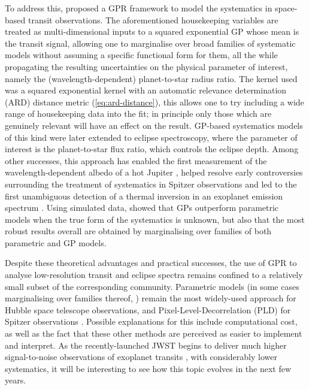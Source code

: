 \documentclass[letterpaper]{ar-1col}
\begin{document}
To address this, \citet{2012MNRAS.419.2683G} proposed a GPR framework to model the systematics in space-based transit observations. The aforementioned housekeeping variables are treated as multi-dimensional inputs to a squared exponential GP whose mean is the transit signal, allowing one to marginalise over broad families of systematic models without assuming a specific functional form for them, all the while propagating the resulting uncertainties on the physical parameter of interest, namely the (wavelength-dependent) planet-to-star radius ratio. The kernel used was a squared exponential kernel with an automatic relevance determination (ARD) distance metric (\autoref{eq:ard-distance}), this allows one to try including a wide range of housekeeping data into the fit; in principle only those which are genuinely relevant will have an effect on the result.
GP-based systematics models of this kind were later extended to eclipse spectroscopy, where the parameter of interest is the planet-to-star flux ratio, which controls the eclipse depth. Among other successes, this approach has enabled the first measurement of the wavelength-dependent albedo of a hot Jupiter \citep{2013ApJ...772L..16E}, helped resolve early controversies surrounding the treatment of systematics in Spitzer observations \citep{2015MNRAS.451..680E} and
led to the first unambiguous detection of a thermal inversion in an exoplanet emission spectrum \citep{2017Natur.548...58E}. Using simulated data, \citet{2014MNRAS.445.3401G} showed that GPs outperform parametric models when the true form of the systematics is unknown, but also that the most robust results overall are obtained by marginalising over families of both parametric and GP models.

Despite these theoretical advantages and practical successes, the use of GPR to analyse low-resolution transit and eclipse spectra remains confined to a relatively small subset of the corresponding community. Parametric models (in some cases marginalising over families thereof, \citealt{2016ApJ...819...10W}) remain the most widely-used approach for Hubble space telescope observations, and Pixel-Level-Decorrelation (PLD) for Spitzer observations \citep{2015ApJ...805..132D}. Possible explanations for this include computational cost, as well as the fact that these other methods are perceived as easier to implement and interpret. As the recently-launched JWST begins to deliver much higher signal-to-noise observations of exoplanet transits \citep[see e.g.][]{https://doi.org/10.48550/arxiv.2208.11692}, with considerably lower systematics, it will be interesting to see how this topic evolves in the next few years.
\end{document}
